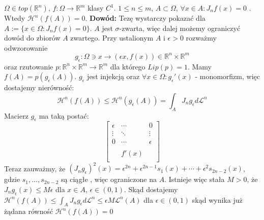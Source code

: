 \begin{lem}
	$\Omega \in top(\mathbb{R}^n)$, $f: \Omega \rightarrow \mathbb{R}^m$ klasy $C^1$. $1 \leq n \leq m$, $A \subset \Omega$, $\forall x \in A: J_nf(x) = 0$ . Wtedy $\mathcal{H}^n(f(A))=0$.
	\newline\newline
	\textbf{Dowód:}\newline
	Tezę wystarczy pokazać dla $A:=\{x \in \Omega: J_nf(x)=0\}$. $A$ jest $\sigma$-zwarta, więc dalej możemy ograniczyć dowód do zbiorów $A$ zwartego. Przy ustalionym $A$ i $\epsilon > 0$ rozważmy odwzorowanie $$
		g_{\epsilon}: \Omega \ni x \rightarrow (\epsilon x, f(x)) \in \mathbb{R}^n \times \mathbb{R}^m
	$$
	oraz rzutowanie $p: \mathbb{R}^n \times \mathbb{R}^m \rightarrow \mathbb{R}^m$ dla którego $Lip(p) = 1$. Mamy $f(A) = p(g_{\epsilon}(A))$. $g_{\epsilon}$ jest injekcją oraz $\forall x \in \Omega: g_{\epsilon}'(x)$ - monomorfizm, więc  dostajemy nierówność: $$
		\mathcal{H}^n(f(A)) \leq \mathcal{H}^n(g_{\epsilon}(A)) = \int_{A} J_ng_{\epsilon} d \mathcal{L}^n
	$$ Macierz $g_{\epsilon}$ ma taką postać: $$
		\begin{bmatrix}
			\epsilon & \cdots & 0 \\
			\vdots & \ddots & \vdots \\
			0 & \cdots & \epsilon \\
			& & \\
			& f'(x) & \\
			& &
		\end{bmatrix}
	$$
	Teraz zauważmy, że $(J_ng_{\epsilon})^2(x) = \epsilon^{2n} + \epsilon^{2n-1}s_1(x) + \cdots + \epsilon^2s_{2n-2}(x)$, gdzie $s_1, ..., s_{2n-2}$ są ciągłe , więc ograniczone na $A$. Istnieje więc stała $M>0$, że $J_ng_{\epsilon}(x)\leq M\epsilon$ dla $x \in A$, $\epsilon \in (0,1)$. Skąd dostajemy $\mathcal{H}^n(f(A)) \leq \int_{A} J_ng_{\epsilon} d \mathcal{L}^n \leq \epsilon M \mathcal{L}^n(A)$ dla $\epsilon \in (0,1)$ skąd wynika już żądana równość $\mathcal{H}^n(f(A)) = 0$ 
\end{lem}